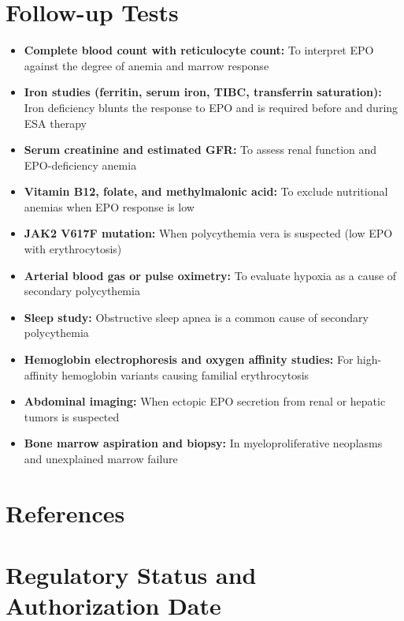 \section*{Follow-up Tests}
\begin{itemize}
  \item \textbf{Complete blood count with reticulocyte count:} To interpret EPO against the degree of anemia and marrow response
  \item \textbf{Iron studies (ferritin, serum iron, TIBC, transferrin saturation):} Iron deficiency blunts the response to EPO and is required before and during ESA therapy
  \item \textbf{Serum creatinine and estimated GFR:} To assess renal function and EPO-deficiency anemia
  \item \textbf{Vitamin B12, folate, and methylmalonic acid:} To exclude nutritional anemias when EPO response is low
  \item \textbf{JAK2 V617F mutation:} When polycythemia vera is suspected (low EPO with erythrocytosis)
  \item \textbf{Arterial blood gas or pulse oximetry:} To evaluate hypoxia as a cause of secondary polycythemia
  \item \textbf{Sleep study:} Obstructive sleep apnea is a common cause of secondary polycythemia
  \item \textbf{Hemoglobin electrophoresis and oxygen affinity studies:} For high-affinity hemoglobin variants causing familial erythrocytosis
  \item \textbf{Abdominal imaging:} When ectopic EPO secretion from renal or hepatic tumors is suspected
  \item \textbf{Bone marrow aspiration and biopsy:} In myeloproliferative neoplasms and unexplained marrow failure
\end{itemize}

\section*{References}



\clearpage
\section*{Regulatory Status and Authorization Date}

\clearpage
